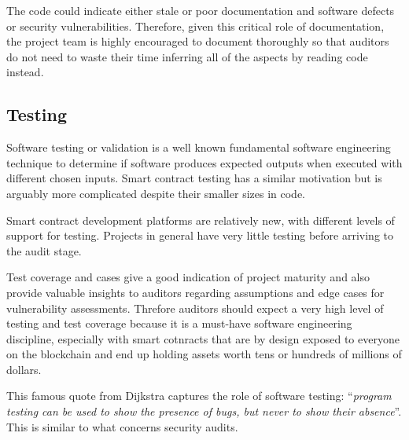 The code could indicate either stale or poor documentation and software
defects or security vulnerabilities. Therefore, given this critical role
of documentation, the project team is highly encouraged to document
thoroughly so that auditors do not need to waste their time inferring
all of the aspects by reading code instead.

\subsection{Testing}\label{testing}

Software testing or validation is a well known fundamental software
engineering technique to determine if software produces expected outputs
when executed with different chosen inputs. Smart contract testing has a
similar motivation but is arguably more complicated despite their
smaller sizes in code.

Smart contract development platforms are relatively new, with different
levels of support for testing. Projects in general have very little
testing before arriving to the audit stage.

Test coverage and cases give a good indication of project maturity and
also provide valuable insights to auditors regarding assumptions and
edge cases for vulnerability assessments. Threfore auditors should
expect a very high level of testing and test coverage because it is a
must-have software engineering discipline, especially with smart
cotnracts that are by design exposed to everyone on the blockchain and
end up holding assets worth tens or hundreds of millions of dollars.

This famous quote from Dijkstra captures the role of software testing:
``\emph{program testing can be used to show the presence of bugs, but
never to show their absence}''. This is similar to what concerns
security audits.
